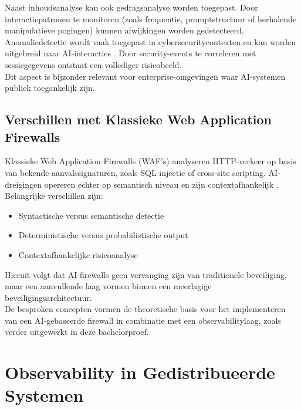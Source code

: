 Naast inhoudsanalyse kan ook gedragsanalyse worden toegepast. Door interactiepatronen te monitoren (zoals frequentie, promptstructuur of herhalende manipulatieve pogingen) kunnen afwijkingen worden gedetecteerd.\\

Anomaliedetectie wordt vaak toegepast in cybersecuritycontexten en kan worden uitgebreid naar AI-interacties \autocite{chandola2009anomaly}. Door security-events te correleren met sessiegegevens ontstaat een vollediger risicobeeld.\\

Dit aspect is bijzonder relevant voor enterprise-omgevingen waar AI-systemen publiek toegankelijk zijn.

\subsection{Verschillen met Klassieke Web Application Firewalls}

Klassieke Web Application Firewalls (WAF’s) analyseren HTTP-verkeer op basis van bekende aanvalssignaturen, zoals SQL-injectie of cross-site scripting. AI-dreigingen opereren echter op semantisch niveau en zijn contextafhankelijk \autocite{owasp2023llm}.\\

Belangrijke verschillen zijn:

\begin{itemize}
    \item Syntactische versus semantische detectie
    \item Deterministische versus probabilistische output
    \item Contextafhankelijke risicoanalyse
\end{itemize}

Hieruit volgt dat AI-firewalls geen vervanging zijn van traditionele beveiliging, maar een aanvullende laag vormen binnen een meerlagige beveiligingsarchitectuur.\\

De besproken concepten vormen de theoretische basis voor het implementeren van een AI-gebaseerde firewall in combinatie met een observabilitylaag, zoals verder uitgewerkt in deze bachelorproef.





\section{Observability in Gedistribueerde Systemen}

